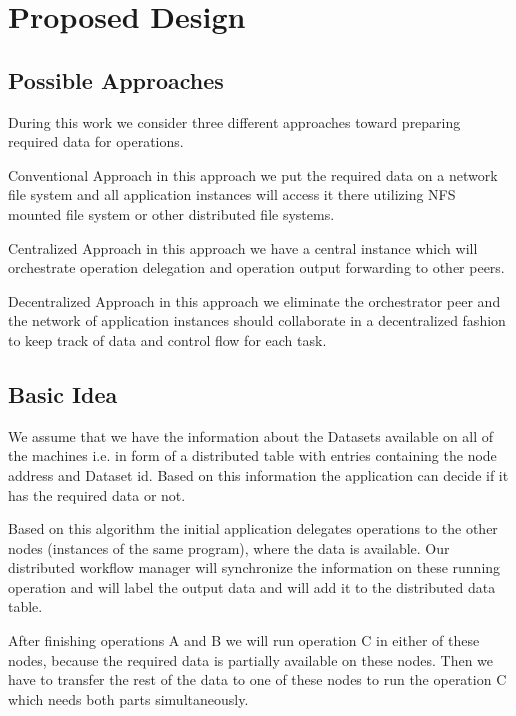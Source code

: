 \chapter{Proposed Design}
\label{cha:proposal}

\section{Possible Approaches}
During this work we consider three different approaches toward preparing required data for operations.
\begin{description}
\item{Conventional Approach} in this approach we put the required data on a network file system and all
application instances will access it there utilizing NFS mounted file system or other distributed file systems.
\item{Centralized Approach} in this approach we have a central instance which will orchestrate operation
delegation and operation output forwarding to other peers.
\item{Decentralized Approach} in this approach we eliminate the orchestrator peer and the network of
application instances should collaborate in a decentralized fashion to keep track of data and control flow for each
task.
\end{description}

\section{Basic Idea}
We assume that we have the information about the Datasets
available on all of the machines i.e. in form of a distributed table
with entries containing the node address and Dataset id. Based on this
information the application can decide if it has the required data or
not. 

Based on this algorithm the initial application delegates operations to the other 
nodes (instances of the same program), where the data is available. 
Our distributed workflow manager will synchronize the information on these running operation and
will label the output data and will add it to the distributed data table.

After finishing operations A and B we will run operation C in either
of these nodes, because the required data is partially available on these
nodes. Then we have to transfer the rest of the data to one of these
nodes to run the operation C which needs both parts simultaneously.

